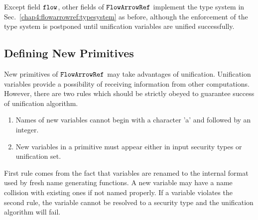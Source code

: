 \documentclass[a4paper]{report}
\newcommand{\co}[1]{$\cod{#1}$}
\begin{document}

Except field \co{flow}, other fields of \co{FlowArrowRef} implement the type system 
in Sec.~\ref{chap4:flowarrowref:typesystem} as before, although the enforcement of the type system is
postponed until unification variables are unified successfully.

\subsection{Defining New Primitives}
New primitives of \co{FlowArrowRef} may take advantages of unification.
Unification variables provide a possibility of receiving information from 
other computations.
However, there are two rules which should be strictly obeyed to guarantee success of unification
algorithm.
\begin{enumerate}
\item Names of new variables cannot begin with a character 'a' and followed by an integer.
\item New variables in a primitive must appear either in input security types or unification set.
\end{enumerate}
First rule comes from the fact that variables are renamed to the internal format used by 
fresh name generating functions. A new variable may 
have a name collision with existing ones if not named properly. 
If a variable violates the second rule, the variable cannot be resolved to a security type and the
unification algorithm will fail.
\end{document}
